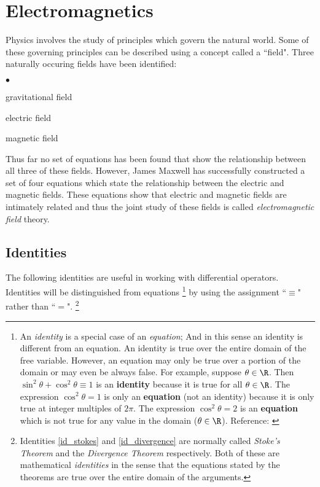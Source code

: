 
\chapter{Electromagnetics}
\label{app:em}
Physics involves the study of principles which govern the natural world.
Some of these governing principles can be described using a concept called a ``field".
Three naturally occuring fields have been identified:
\begin{list}{$\bullet$}{\setlength{\parsep }{0ex} \setlength{\itemsep}{0.5ex}}
   \item gravitational field
   \item electric field
   \item magnetic field
\end{list}

Thus far no set of equations has been found
that show the relationship between all three of these fields.
However, James Maxwell has successfully constructed a set of four equations which state the
relationship between the electric and magnetic fields.
These equations show that electric and magnetic fields are intimately related and thus
the joint study of these fields is called {\em electromagnetic field} theory.


\section{Identities}
The following identities
are useful in working with differential operators.
Identities will be distinguished from equations
\footnote{
   An {\em identity} is a special case of an {\em equation};
   And in this sense an identity is different from an equation.
   An identity is true over the entire domain of the free variable.
   However, an equation may only be true over a portion of the domain or may even be always false.
   For example, suppose $\theta\in\R$.
   Then $\sin^2\theta + \cos^2\theta \equiv 1$ is an {\bf identity} because it is true for all $\theta\in\R$.
   The expression $\cos^2\theta=1$ is only an {\bf equation} (not an identity) because it is only true
   at integer multiples of $2\pi$.
   The expression $\cos^2\theta=2$ is an {\bf equation} which is not true for any value in the domain ($\theta\in\R$).
   Reference: \cite{smith}
   }
by using the assignment ``$\equiv$" rather than ``$=$".
\footnote{
   Identities \ref{id_stokes} and \ref{id_divergence} are normally called
   {\em Stoke's Theorem} and the {\em Divergence Theorem} respectively.
   Both of these are mathematical {\em identities} in the sense that the equations
   stated by the theorems are true over the entire domain of the arguments.
}

